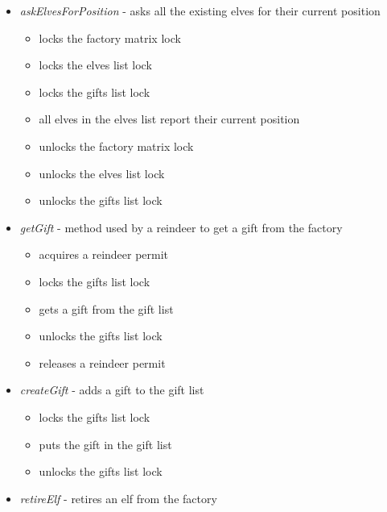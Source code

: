 \documentclass{article}
\begin{document}
\begin{itemize}
\begin{itemize}
\begin{itemize}
                    \end{itemize}
                \item \textit{askElvesForPosition} - asks all the existing elves for their current position
                    \begin{itemize}
                        \item locks the factory matrix lock
                        \item locks the elves list lock
                        \item locks the gifts list lock
                        \item all elves in the elves list report their current position
                         \item unlocks the factory matrix lock
                        \item unlocks the elves list lock
                        \item unlocks the gifts list lock
                    \end{itemize}
                \item \textit{getGift} - method used by a reindeer to get a gift from the factory
                    \begin{itemize}
                        \item acquires a reindeer permit
                        \item locks the gifts list lock
                        \item gets a gift from the gift list
                        \item unlocks the gifts list lock
                        \item releases a reindeer permit
                    \end{itemize}
                \item \textit{createGift} - adds a gift to the gift list
                    \begin{itemize}
                        \item locks the gifts list lock
                        \item puts the gift in the gift list
                        \item unlocks the gifts list lock
                    \end{itemize}
                \item \textit{retireElf} - retires an elf from the factory
                    \begin{itemize}

\end{itemize}
\end{itemize}
\end{itemize}
\end{document}

